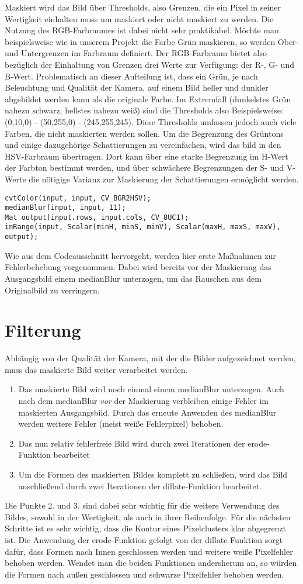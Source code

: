 \documentclass[12pt]{article}
\begin{document}
Maskiert wird das Bild über Thresholds, also Grenzen, die ein Pixel in seiner Wertigkeit einhalten muss um maskiert oder nicht maskiert zu werden. Die Nutzung des RGB-Farbraumes ist dabei nicht sehr praktikabel. Möchte man beispielsweise wie in unserem Projekt die Farbe Grün maskieren, so werden Ober- und Untergrenzen im Farbraum definiert. Der RGB-Farbraum bietet also bezüglich der Einhaltung von Grenzen drei Werte zur Verfügung: der R-, G- und B-Wert. Problematisch an dieser Aufteilung ist, dass ein Grün, je nach Beleuchtung und Qualität der Kamera, auf einem Bild heller und dunkler abgebildet werden kann als die originale Farbe. Im Extremfall (dunkelstes Grün nahezu schwarz, hellstes nahezu weiß) sind die Thresholds also Beispielsweise: (0,10,0) - (50,255,0) - (245,255,245). Diese Thresholds umfassen jedoch auch viele Farben, die nicht maskierten werden sollen. Um die Begrenzung des Grüntons und einige dazugehörige Schattierungen zu vereinfachen, wird das bild in den HSV-Farbraum übertragen. Dort kann über eine starke Begrenzung im H-Wert der Farbton bestimmt werden, und über schwächere Begrenzungen der S- und V-Werte die nötigige Varianz zur Maskierung der Schattierungen ermöglicht werden.
\begin{lstlisting}
cvtColor(input, input, CV_BGR2HSV);
medianBlur(input, input, 11);
Mat output(input.rows, input.cols, CV_8UC1);
inRange(input, Scalar(minH, minS, minV), Scalar(maxH, maxS, maxV), output);
\end{lstlisting}
Wie aus dem Codeausschnitt hervorgeht, werden hier erste Maßnahmen zur Fehlerbehebung vorgenommen. Dabei wird bereits vor der Maskierung das Ausgangsbild einem medianBlur unterzogen, um das Rauschen aus dem Originalbild zu verringern.
\section{Filterung}
Abhängig von der Qualität der Kamera, mit der die Bilder aufgezeichnet werden, muss das maskierte Bild weiter verarbeitet werden.
\begin{enumerate}
\item Das maskierte Bild wird noch einmal einem medianBlur unterzogen. Auch nach dem medianBlur \emph{vor} der Maskierung verbleiben einige Fehler im maskierten Ausgangsbild. Durch das erneute Anwenden des medianBlur werden weitere Fehler (meist weiße Fehlerpixel) behoben.
\item Das nun relativ fehlerfreie Bild wird durch zwei Iterationen der erode-Funktion bearbeitet 
\item Um die Formen des maskierten Bildes komplett zu schließen, wird das Bild anschließend durch zwei Iterationen der dillate-Funktion bearbeitet.
\end{enumerate}
Die Punkte 2. und 3. sind dabei sehr wichtig für die weitere Verwendung des Bildes, sowohl in der Wertigkeit, als auch in ihrer Reihenfolge. Für die nächsten Schritte ist es sehr wichtig, dass die Kontur eines Pixelclusters klar abgegrenzt ist. Die Anwendung der erode-Funktion gefolgt von der dillate-Funktion sorgt dafür, dass Formen nach Innen geschlossen werden und weitere weiße Pixelfehler behoben werden. Wendet man die beiden Funktionen andersherum an, so würden die Formen nach außen geschlossen und schwarze Pixelfehler behoben werden.
\end{document}
